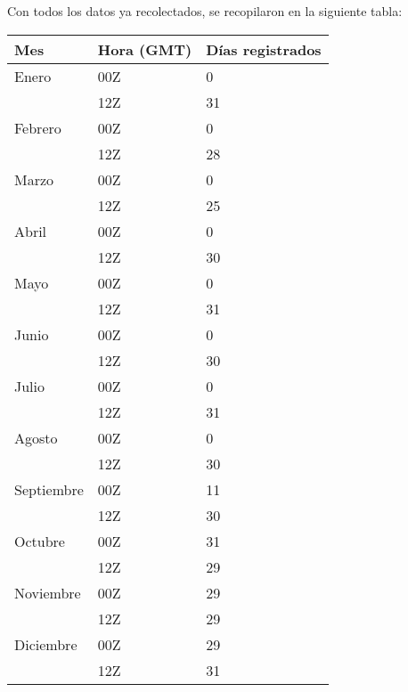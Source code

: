 \documentclass{article}
\begin{document}
\newpage
Con todos los datos ya recolectados, se recopilaron en la siguiente tabla:\\
\begin{center}
\begin{tabular}{ | l | l | l | }
\hline

	Mes & Hora (GMT) & Días registrados \\ \hline
	Enero & 00Z & 0 \\ \hline
	 & 12Z & 31 \\ \hline
	Febrero & 00Z & 0 \\ \hline
	 & 12Z & 28 \\ \hline
	Marzo & 00Z & 0 \\ \hline
	 & 12Z & 25 \\ \hline
	Abril & 00Z & 0 \\ \hline
	 & 12Z & 30 \\ \hline
	Mayo & 00Z & 0 \\ \hline
	 & 12Z & 31 \\ \hline
	Junio & 00Z & 0 \\ \hline
	 & 12Z & 30 \\ \hline
	Julio & 00Z & 0 \\ \hline
	 & 12Z & 31 \\ \hline
	Agosto & 00Z & 0 \\ \hline
	 & 12Z & 30 \\ \hline
	Septiembre & 00Z & 11 \\ \hline
	 & 12Z & 30 \\ \hline
	Octubre & 00Z & 31 \\ \hline
	 & 12Z & 29 \\ \hline
	Noviembre & 00Z & 29 \\ \hline
	 & 12Z & 29 \\ \hline
	Diciembre & 00Z & 29 \\ \hline
	 & 12Z & 31 \\ \hline
\end{tabular}
\end{center}
\end{document}
